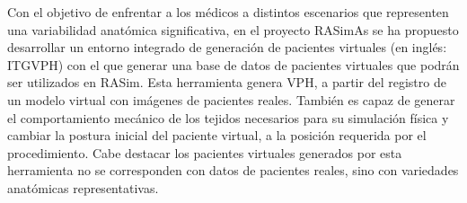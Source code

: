 Con el objetivo de enfrentar a los médicos a distintos escenarios que representen una variabilidad anatómica significativa, en el proyecto \ac{RASimAs} se ha propuesto desarrollar un entorno integrado de generación de pacientes virtuales (en inglés: \ac{ITGVPH}) con el que generar una base de datos de pacientes virtuales  que  podrán ser utilizados en \ac{RASim}. 
%
Esta herramienta genera \ac{VPH}, a partir del registro de un modelo virtual con imágenes de pacientes reales.
También es capaz de generar el comportamiento mecánico  de los tejidos necesarios para su simulación física y  cambiar la postura inicial del paciente virtual, a la posición requerida por el procedimiento. Cabe destacar los pacientes virtuales generados por esta herramienta no se corresponden con datos de pacientes reales, sino con variedades anatómicas representativas.








